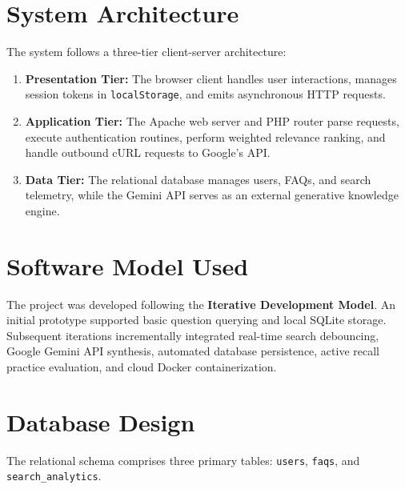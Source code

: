 \section{System Architecture}
The system follows a three-tier client-server architecture:
\begin{enumerate}
    \item \textbf{Presentation Tier:} The browser client handles user interactions, manages session tokens in \texttt{localStorage}, and emits asynchronous HTTP requests.
    \item \textbf{Application Tier:} The Apache web server and PHP router parse requests, execute authentication routines, perform weighted relevance ranking, and handle outbound cURL requests to Google's API.
    \item \textbf{Data Tier:} The relational database manages users, FAQs, and search telemetry, while the Gemini API serves as an external generative knowledge engine.
\end{enumerate}

\section{Software Model Used}
The project was developed following the \textbf{Iterative Development Model}. An initial prototype supported basic question querying and local SQLite storage. Subsequent iterations incrementally integrated real-time search debouncing, Google Gemini API synthesis, automated database persistence, active recall practice evaluation, and cloud Docker containerization.

\section{Database Design}
The relational schema comprises three primary tables: \texttt{users}, \texttt{faqs}, and \texttt{search\_analytics}.

